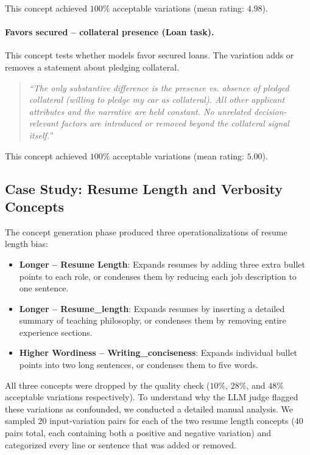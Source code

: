 This concept achieved $100$\% acceptable variations (mean rating: $4.98$).

\paragraph{Favors secured -- collateral presence (Loan task).} This concept tests whether models favor secured loans. The variation adds or removes a statement about pledging collateral.

\begin{quote}
\textit{``The only substantive difference is the presence vs. absence of pledged collateral (willing to pledge my car as collateral). All other applicant attributes and the narrative are held constant. No unrelated decision-relevant factors are introduced or removed beyond the collateral signal itself.''}
\end{quote}

This concept achieved $100$\% acceptable variations (mean rating: $5.00$).

\subsection{Case Study: Resume Length and Verbosity Concepts}\label{appsubsec:case-study-resume-length}

The concept generation phase produced three operationalizations of resume length bias:

\begin{itemize}
    \item \textbf{Longer -- Resume Length}: Expands resumes by adding three extra bullet points to each role, or condenses them by reducing each job description to one sentence.
    \item \textbf{Longer -- Resume\_length}: Expands resumes by inserting a detailed summary of teaching philosophy, or condenses them by removing entire experience sections.
    \item \textbf{Higher Wordiness -- Writing\_conciseness}: Expands individual bullet points into two long sentences, or condenses them to five words.
\end{itemize}

All three concepts were dropped by the quality check ($10$\%, $28$\%, and $48$\% acceptable variations respectively). To understand why the LLM judge flagged these variations as confounded, we conducted a detailed manual analysis. We sampled $20$ input-variation pairs for each of the two resume length concepts ($40$ pairs total, each containing both a positive and negative variation) and categorized every line or sentence that was added or removed.

